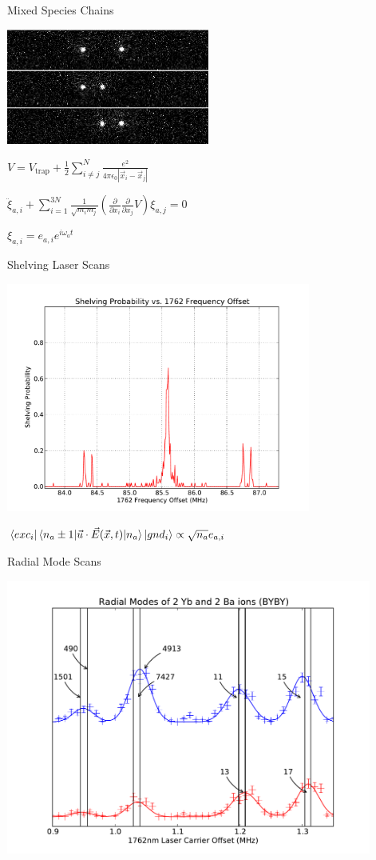 \documentclass{beamer}
\begin{document}
\begin{frame}{Mixed Species Chains}
	\centerline{\includegraphics[width=0.5\textwidth]{BaYb}}
	\vfill
	\pause
	\centerline{$V = V_\mathrm{trap} + \frac{1}{2}\sum\limits_{i \ne j}^N \frac{e^2}{4\pi\epsilon_0 \left| \vec{x}_i - \vec{x}_j \right|}$}
	\centerline{$\ddot{\xi}_{a,i} + \sum\limits_{i=1}^{3N} \frac{1}{\sqrt{m_i m_j}} \left( \frac{\partial}{\partial x_i}\frac{\partial}{\partial x_j} V \right) \xi_{a,j} = 0$}
	\centerline{$\xi_{a,i} = e_{a,i} e^{i \omega_a t}$}
\end{frame}

\begin{frame}{Shelving Laser Scans}
	\centering
	\centerline{\includegraphics[width=0.75\textwidth]{FullScan}}
	\vfill
	\centerline{${\Large\bra{exc_i}\bra{n_{a} \pm 1}} \vec{u} \cdot \vec{E}(\vec{x}, t) {\Large \ket{n_{a}}\ket{gnd_i}} \propto \sqrt{n_{a}} e_{a,i}$}
\end{frame}

\begin{frame}{Radial Mode Scans}
	\centerline{\includegraphics[width=0.9\textwidth]{RadialScanBYBY}}
\end{frame}
\end{document}
